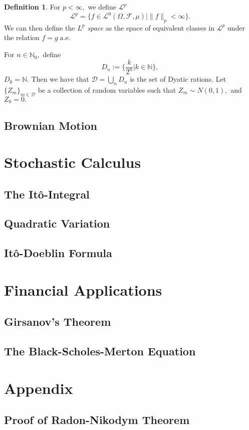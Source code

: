 \documentclass[openany, amssymb, psamsfonts]{amsart}
\theoremstyle{definition}
\newtheorem{defn}{Definition}[section]
\numberwithin{equation}{section}
\newcommand{\bbN}{\mathbb{N}}
\newcommand{\norm}[1]{\lVert #1 \rVert}
\begin{document}
\begin{defn}
For $p<\infty,$ we define $\mathcal{L}^p$
\[\mathcal{L}^p = \{f\in \mathcal{L}^0(\Omega, \mathcal{F}, \mu) | \norm{f}_p< \infty\}.\] We can then define the \textit{$L^p$ space} as the space of equivalent classes in $\mathcal{L}^p$ under the relation $f = g\; \text{a.e}.$
\end{defn}
For $n\in \bbN_0,$ define 
\[D_n := \{\frac{k}{2^n} | k \in \bbN\},\] $D_0 = \bbN.$ Then we have that $\mathcal{D} = \displaystyle\bigcup_n D_n$ is the set of Dyatic rations. Let $\{Z_m\}_{m\in \mathcal{D}}$ be a collection of random variables such that $Z_m \sim N(0,1),$ and $Z_0 = 0.$

\subsection{Brownian Motion}


\section{Stochastic Calculus}
\subsection{The It\^{o}-Integral}
\subsection{Quadratic Variation}
\subsection{It\^{o}-Doeblin Formula}
\section{Financial Applications}
\subsection{Girsanov's Theorem}
\subsection{The Black-Scholes-Merton Equation}
\section{Appendix}
\subsection{Proof of Radon-Nikodym Theorem}
\end{document}
